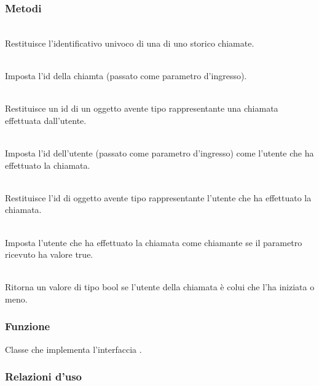 \subsubsection*{Metodi}
\begin{description}
	\item{}\\
	Restituisce l'identificativo univoco di una  di uno storico chiamate.
	
	\item{}\\
	Imposta l'id della chiamta  (passato come parametro d'ingresso).
	\item{}\\
	Restituisce un id di un oggetto avente tipo  rappresentante una chiamata effettuata dall'utente.
	
	\item{}\\
	Imposta l'id dell'utente  (passato come parametro d'ingresso) come l'utente che ha effettuato la chiamata.
	\item{}\\
	Restituisce l'id di oggetto avente tipo  rappresentante l'utente che ha effettuato la chiamata.
	
	\item{}\\
	Imposta l'utente che ha effettuato la chiamata come chiamante se il parametro ricevuto ha valore true.
	\item{}\\
	Ritorna un valore di tipo bool se l'utente della chiamata è colui che l'ha iniziata o meno.
\end{description}





\subsubsection*{Funzione}
Classe che implementa l'interfaccia .

\subsubsection*{Relazioni d'uso}

